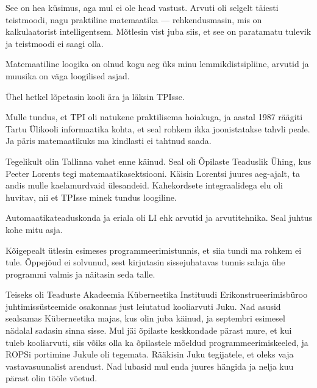 See on hea küsimus, aga mul ei ole head vastust. Arvuti oli selgelt täiesti 
teistmoodi, nagu praktiline matemaatika --- rehkendusmasin, mis on kalkulaatorist intelligentsem. Mõtlesin vist
juba siis, et see on paratamatu tulevik ja teistmoodi ei saagi olla. 


Matemaatiline loogika on olnud kogu aeg üks minu lemmikdistsipliine, arvutid 
ja muusika on väga loogilised asjad. 

Ühel hetkel lõpetasin kooli ära ja läksin TPIsse.


Mulle tundus, et TPI oli natukene praktilisema hoiakuga, ja aastal 
1987 räägiti Tartu Ülikooli informaatika kohta, 
et seal rohkem ikka joonistatakse tahvli peale. Ja päris matemaatikuks ma kindlasti 
ei tahtnud saada.

Tegelikult olin Tallinna vahet enne käinud. Seal oli Õpilaste 
Teaduslik Ühing, kus Peeter 
Lorents tegi matemaatikasektsiooni. Käisin 
Lorentsi juures aeg-ajalt, ta andis mulle kaelamurdvaid 
ülesandeid. Kahekordsete integraalidega 
elu oli huvitav, nii et TPIsse minek tundus loogiline.


Automaatikateaduskonda ja eriala oli
LI ehk arvutid ja 
arvutitehnika. Seal juhtus kohe mitu asja. 

Kõigepealt ütlesin esimeses programmeerimistunnis, et siia tundi ma rohkem 
ei tule. Õppejõud ei solvunud, sest kirjutasin sissejuhatavas tunnis salaja
ühe programmi valmis ja näitasin seda talle.

Teiseks oli Teaduste Akadeemia Küberneetika Instituudi 
Erikonstrueerimisbüroo juhtimissüsteemide osakonnas just
leiutatud kooliarvuti Juku. Nad asusid sealsamas Küberneetika majas, kus olin juba käinud, ja 
septembri esimesel nädalal sadasin sinna sisse. Mul jäi 
õpilaste keskkondade pärast mure, et kui tuleb kooliarvuti, siis võiks olla ka 
õpilastele mõeldud programmeerimiskeeled, ja ROPSi portimine 
Jukule oli tegemata. Rääkisin Juku tegijatele, et oleks vaja vastavasuunalist 
arendust. Nad lubasid mul enda juures hängida ja nelja kuu pärast 
olin tööle võetud. 

